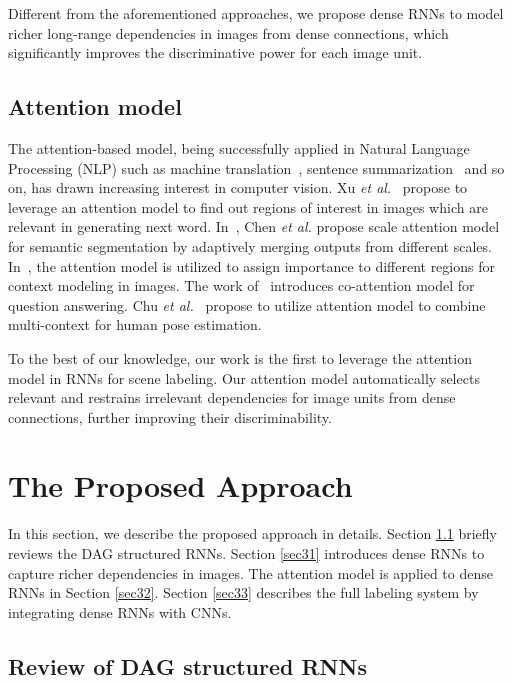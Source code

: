 \documentclass[10pt,twocolumn,letterpaper]{article}
\begin{document}
Different from the aforementioned approaches, we propose dense RNNs to model richer long-range dependencies in images from dense connections, which significantly improves the discriminative power for each image unit.

\subsection{Attention model}

The attention-based model, being successfully applied in Natural Language Processing (NLP) such as machine translation~\cite{bahdanau2014neural}, sentence summarization~\cite{rush2015neural} and so on, has drawn increasing interest in computer vision. Xu {\it et al.}~\cite{xu2015show} propose to leverage an attention model to find out regions of interest in images which are relevant in generating next word. In~\cite{chen2016attention}, Chen {\it et al.} propose scale attention model for semantic segmentation by adaptively merging outputs from different scales. In~\cite{abdulnabi2017episodic}, the attention model is utilized to assign importance to different regions for context modeling in images. The work of~\cite{lu2016hierarchical} introduces co-attention model for question answering. Chu {\it et al.}~\cite{chu2017multi} propose to utilize attention model to combine multi-context for human pose estimation.

To the best of our knowledge, our work is the first to leverage the attention model in RNNs for scene labeling. Our attention model automatically selects relevant and restrains irrelevant dependencies for image units from dense connections, further improving their discriminability.

\section{The Proposed Approach}
\label{drnns}

In this section, we describe the proposed approach in details. Section \ref{sec30} briefly reviews the DAG structured RNNs. Section \ref{sec31} introduces dense RNNs to capture richer dependencies in images. The attention model is applied to dense RNNs in Section \ref{sec32}. Section \ref{sec33} describes the full labeling system by integrating dense RNNs with CNNs.

\subsection{Review of DAG structured RNNs}
\label{sec30}
\end{document}
